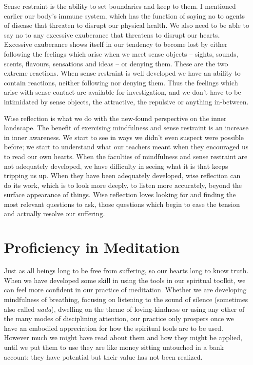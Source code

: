Sense restraint is the ability to set boundaries and keep to them. I
mentioned earlier our body’s immune system, which has the function of
saying no to agents of disease that threaten to disrupt our physical
health. We also need to be able to say no to any excessive exuberance
that threatens to disrupt our hearts. Excessive exuberance shows itself
in our tendency to become lost by either following the feelings which
arise when we meet sense objects – sights, sounds, scents, flavours,
sensations and ideas – or denying them. These are the two extreme
reactions. When sense restraint is well developed we have an ability to
contain reactions, neither following nor denying them. Thus the feelings
which arise with sense contact are available for investigation, and we
don’t have to be intimidated by sense objects, the attractive, the
repulsive or anything in-between.

Wise reflection is what we do with the new-found perspective on the
inner landscape. The benefit of exercising mindfulness and sense
restraint is an increase in inner awareness. We start to see in ways we
didn’t even suspect were possible before; we start to understand what
our teachers meant when they encouraged us to read our own hearts. When
the faculties of mindfulness and sense restraint are not adequately
developed, we have difficulty in seeing what it is that keeps tripping
us up. When they have been adequately developed, wise reflection can do
its work, which is to look more deeply, to listen more accurately,
beyond the surface appearance of things. Wise reflection loves looking
for and finding the most relevant questions to ask, those questions
which begin to ease the tension and actually resolve our suffering.

\section{Proficiency in Meditation}

Just as all beings long to be free from suffering, so our hearts long
to know truth. When we have developed some skill in using the tools in
our spiritual toolkit, we can feel more confident in our practice of
meditation. Whether we are developing mindfulness of breathing, focusing
on listening to the sound of silence
(sometimes also called
\emph{nada}),\cite{inner-listening}
dwelling on the theme of loving-kindness or using any other of the
many modes of disciplining attention, our practice only prospers once we
have an embodied appreciation for how the spiritual tools are to be
used. However much we might have read about them and how they might be
applied, until we put them to use they are like money sitting untouched
in a bank account: they have potential but their value has not been
realized.

